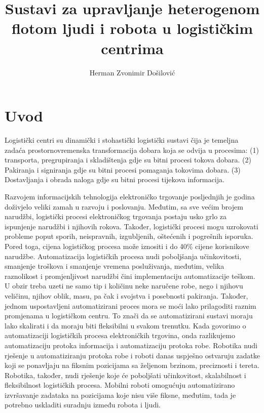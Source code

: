 \documentclass[times, utf8, seminar]{fer}
\begin{document}


\title{
    Sustavi za upravljanje heterogenom flotom ljudi i robota u logističkim centrima
}

\author{Herman Zvonimir Došilović}

\maketitle

\tableofcontents

\chapter{Uvod}
Logistički centri su dinamički i stohastički logistički sustavi
čija je temeljna zadaća prostornovremenska transformacija
dobara koja se odvija u procesima: (1) transporta, pregrupiranja i skladištenja gdje
su bitni procesi tokova dobara. (2) Pakiranja i signiranja gdje su bitni procesi
pomaganja tokovima dobara. (3) Dostavljanja i obrada naloga gdje su bitni procesi
tijekova informacija. \citep{Paladin, buntak2012medjusobni}

Razvojem informacijskih tehnologija elektroničko trgovanje 
 posljednjih je godina
doživjelo veliki zamah u razvoju i poslovanju. Međutim, sa sve većim brojem narudžbi,
logistički procesi elektroničkog trgovanja postaju usko grlo 
za ispunjenje narudžbi i njihovih rokova. Također, logistički procesi mogu uzrokovati
probleme poput sporih, neispravnih, izgubljenih, oštećenih i pogrešnih isporuka. 
Pored toga, cijena logističkog procesa može iznositi
i do 40\% cijene korisnikove narudžbe.
Automatizacija logističkih procesa nudi poboljšanja učinkovitosti, smanjenje troškova
i smanjenje vremena posluživanja, međutim, velika raznolikost i promjenljivost
narudžbi čini implementaciju automatizacije teškom. U obzir treba uzeti
ne samo tip i količinu neke naručene robe, nego i njihovu veličinu, njihov 
oblik, masu, pa čak i svojstva i posebnosti pakiranja. Također, jednom
uspostavljeni automatizirani proces mora se moći lako prilagoditi 
raznim promjenama u logističkom centru. To znači da se automatizirani sustavi
moraju lako skalirati i da moraju biti fleksibilni u svakom trenutku.
Kada govorimo o automatizaciji logističkih procesa elektroničkih trgovina, onda
razlikujemo automatizaciju protoka informacija i automatizaciju protoka robe.
Robotika nudi rješenje u automatiziranju protoka robe i roboti danas uspješno
ostvaruju zadatke koji se ponavljaju na fiksnim pozicijama sa željenom brzinom,
preciznosti i tereta. Robotika, također, nudi rješenje koje će
poboljšati učinkovitost, skalabilnost i fleksibilnost logističkih procesa.
Mobilni roboti omogućuju automatizirano izvršavanje zadataka na pozicijama
koje nisu više fiksne, međutim, tada je potrebno uskladiti suradnju između robota
i ljudi. \citep{huang2015robotics}
\end{document}
